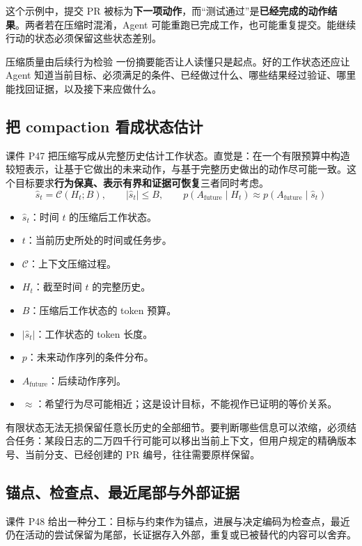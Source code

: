 \documentclass[11pt,a4paper]{article}
\begin{document}
这个示例中，提交 PR 被标为\textbf{下一项动作}，而“测试通过”是\textbf{已经完成的动作结果}。两者若在压缩时混淆，Agent 可能重跑已完成工作，也可能重复提交。能继续行动的状态必须保留这些状态差别。

\begin{importantbox}{压缩质量由后续行为检验}
一份摘要能否让人读懂只是起点。好的工作状态还应让 Agent 知道当前目标、必须满足的条件、已经做过什么、哪些结果经过验证、哪里能找回证据，以及接下来应做什么。
\end{importantbox}

\subsection{把 compaction 看成状态估计}

课件 P47 把压缩写成从完整历史估计工作状态。直觉是：在一个有限预算中构造较短表示，让基于它做出的未来动作，与基于完整历史做出的动作尽可能一致。这个目标要求\textbf{行为保真、表示有界和证据可恢复}三者同时考虑。
$$
\hat{s}_t=\mathcal{C}(H_t;B),\qquad
|\hat{s}_t|\leq B,\qquad
p(A_{\mathrm{future}}\mid H_t)\approx
p(A_{\mathrm{future}}\mid\hat{s}_t)
$$
\begin{itemize}
\item $\hat{s}_t$：时间 $t$ 的压缩后工作状态。
\item $t$：当前历史所处的时间或任务步。
\item $\mathcal{C}$：上下文压缩过程。
\item $H_t$：截至时间 $t$ 的完整历史。
\item $B$：压缩后工作状态的 token 预算。
\item $|\hat{s}_t|$：工作状态的 token 长度。
\item $p$：未来动作序列的条件分布。
\item $A_{\mathrm{future}}$：后续动作序列。
\item $\approx$：希望行为尽可能相近；这是设计目标，不能视作已证明的等价关系。
\end{itemize}

有限状态无法无损保留任意长历史的全部细节。要判断哪些信息可以浓缩，必须结合任务：某段日志的二万四千行可能可以移出当前上下文，但用户规定的精确版本号、当前分支、已经创建的 PR 编号，往往需要原样保留。

\subsection{锚点、检查点、最近尾部与外部证据}

课件 P48 给出一种分工：目标与约束作为锚点，进展与决定编码为检查点，最近仍在活动的尝试保留为尾部，长证据存入外部，重复或已被替代的内容可以舍弃。
\end{document}
